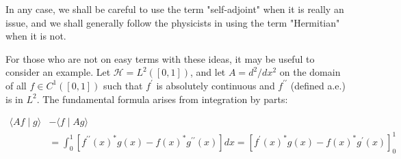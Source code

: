 \documentclass[10pt, letterpaper]{article}
\begin{document}
In any case, we shall be careful to use the term "self-adjoint" when it is really an issue, and we shall generally follow the physicists in using the term "Hermitian" when it is not.

For those who are not on easy terms with these ideas, it may be useful to consider an example. Let $\mathcal{H}=L^{2}([0,1])$, and let $A=d^{2} / d x^{2}$ on the domain of all $f \in C^{1}([0,1])$ such that $f^{\prime}$ is absolutely continuous and $f^{\prime \prime}$ (defined a.e.) is in $L^{2}$. The fundamental formula arises from integration by parts:

$$
\begin{aligned}
\langle A f \mid g\rangle & -\langle f \mid A g\rangle \\
& =\int_{0}^{1}\left[f^{\prime \prime}(x)^{*} g(x)-f(x)^{*} g^{\prime \prime}(x)\right] d x=\left[f^{\prime}(x)^{*} g(x)-f(x)^{*} g^{\prime}(x)\right]_{0}^{1}
\end{aligned}
$$
\end{document}
